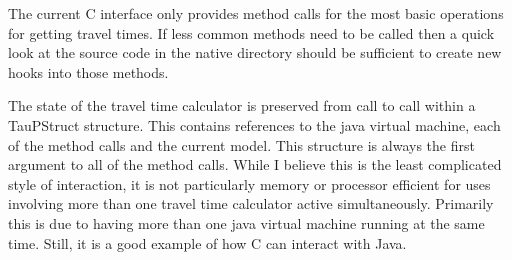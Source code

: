 The current C interface only provides method calls for the most basic
operations for getting travel times. If less common methods need to be called
then a quick look at the source code in the native directory
should be sufficient to create new hooks into those methods.

The state of the travel time calculator is preserved from call to call within
a TauPStruct structure. This contains references to the java virtual machine,
each of the method calls and the current model. This structure is always
the first argument to all of the method calls. While I believe this is the
least complicated style of interaction, it is not particularly memory
or processor efficient for uses involving more than one travel time calculator
active simultaneously. Primarily this is due to having more than one
java virtual machine running at the same time. Still, it is a
good example of how C can interact with Java.

